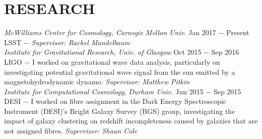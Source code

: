 \section{\textbf{\color{RoyalBlue}RESEARCH}}

{\sl McWilliams Center for Cosmology, Carnegie Mellon Univ.} \hfill Jan 2017 $-$ Present
\hspace{3 mm} LSST $-$
\emph{Supervisor: Rachel Mandelbaum}\\


{\sl Institute for Gravitational Research, Univ. of Glasgow} \hfill Oct 2015 $-$ Sep 2016 
\hspace{3 mm}\indent LIGO $-$ I worked on gravitational wave data analysis, particularly on investigating potential gravitational wave signal from the sun emitted by a magnetohydrodynamic dynamo. \emph{Supervisor: Matthew Pitkin}\\


{\sl Institute for Computational Cosmology, Durham Univ.} \hspace{10 mm}  Jun 2015 $-$ Sep 2015 
DESI $-$ I worked on fibre assignment in the Dark Energy Spectroscopic Instrument (DESI)'s Bright Galaxy Survey (BGS) group, investigating the impact of galaxy clustering on redshift incompleteness caused by galaxies that are not assigned fibres. \emph{Supervisor: Shaun Cole}
 
